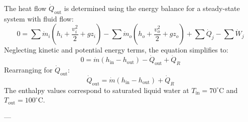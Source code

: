 The heat flow \( \dot{Q}_{\text{out}} \) is determined using the energy balance for a steady-state system with fluid flow:  
\[
0 = \sum \dot{m}_i \left( h_i + \frac{v_i^2}{2} + gz_i \right) - \sum \dot{m}_o \left( h_o + \frac{v_o^2}{2} + gz_o \right) + \sum \dot{Q}_j - \sum \dot{W}_j
\]  
Neglecting kinetic and potential energy terms, the equation simplifies to:  
\[
0 = \dot{m} \left( h_{\text{in}} - h_{\text{out}} \right) - \dot{Q}_{\text{out}} + \dot{Q}_R
\]  
Rearranging for \( \dot{Q}_{\text{out}} \):  
\[
\dot{Q}_{\text{out}} = \dot{m} \left( h_{\text{in}} - h_{\text{out}} \right) + \dot{Q}_R
\]  
The enthalpy values correspond to saturated liquid water at \( T_{\text{in}} = 70^\circ\text{C} \) and \( T_{\text{out}} = 100^\circ\text{C} \).  

---